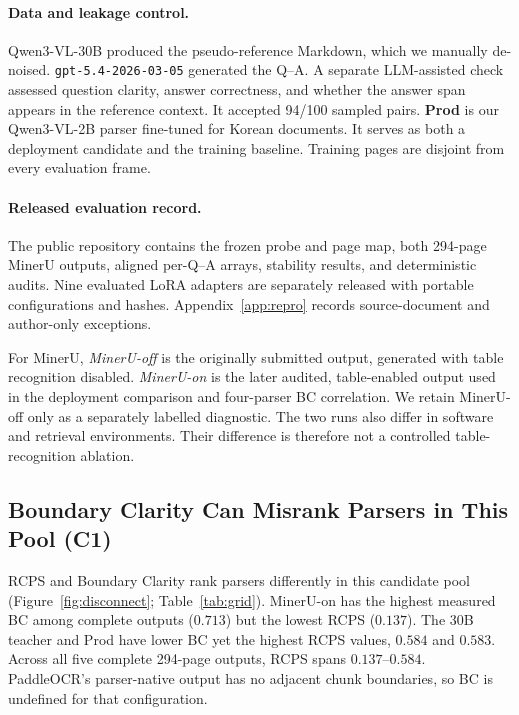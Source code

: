 \documentclass[11pt]{article}
\newcommand{\rcps}{\textnormal{\textsc{RCPS}}}
\newcommand{\contribIntrinsic}{C1}
\begin{document}
\paragraph{Data and leakage control.} Qwen3-VL-30B produced the pseudo-reference Markdown, which we manually de-noised. \texttt{gpt-5.4-2026-03-05} generated the Q--A. A separate LLM-assisted check assessed question clarity, answer correctness, and whether the answer span appears in the reference context. It accepted 94/100 sampled pairs. \textbf{Prod} is our Qwen3-VL-2B parser \citep{qwen3vl} fine-tuned for Korean documents. It serves as both a deployment candidate and the training baseline. Training pages are disjoint from every evaluation frame.

\paragraph{Released evaluation record.} The public repository contains the frozen probe and page map, both 294-page MinerU outputs, aligned per-Q--A arrays, stability results, and deterministic audits. Nine evaluated LoRA adapters are separately released with portable configurations and hashes. Appendix~\ref{app:repro} records source-document and author-only exceptions.

For MinerU, \emph{MinerU-off} is the originally submitted output, generated with table recognition disabled. \emph{MinerU-on} is the later audited, table-enabled output used in the deployment comparison and four-parser BC correlation. We retain MinerU-off only as a separately labelled diagnostic. The two runs also differ in software and retrieval environments. Their difference is therefore not a controlled table-recognition ablation.

\subsection{Boundary Clarity Can Misrank Parsers in This Pool (\contribIntrinsic)}
\label{sec:c1}

\rcps{} and Boundary Clarity rank parsers differently in this candidate pool (Figure~\ref{fig:disconnect}; Table~\ref{tab:grid}). MinerU-on has the highest measured BC among complete outputs ($0.713$) but the lowest \rcps{} ($0.137$). The 30B teacher and Prod have lower BC yet the highest \rcps{} values, $0.584$ and $0.583$. Across all five complete 294-page outputs, \rcps{} spans $0.137$--$0.584$. PaddleOCR's parser-native output has no adjacent chunk boundaries, so BC is undefined for that configuration.
\end{document}
